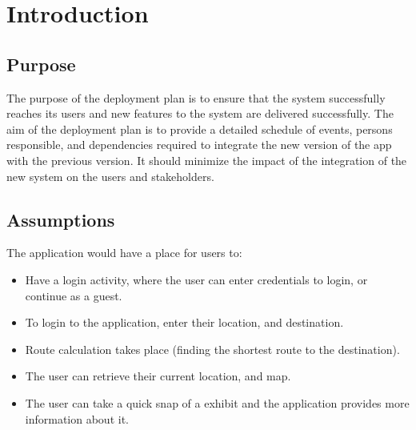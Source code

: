 \section{Introduction}
\subsection{Purpose}
The purpose of the deployment plan is to ensure that the system successfully reaches its users and new features to the system are delivered successfully. The aim of the deployment plan is to provide a detailed schedule of events, persons responsible, and dependencies required to integrate the new version of the app with the previous version. It should minimize the impact of the integration of the new system on the users and stakeholders.

\subsection{Assumptions}
The application would have a place for users to:
\begin{itemize}
    \item Have a login activity, where the user can enter credentials to login, or continue as a guest.
    \item To login to the application, enter their location, and destination.
    \item Route calculation takes place (finding the shortest route to the destination).
    \item The user can retrieve their current location, and map.
    \item The user can take a quick snap of a exhibit and the application provides more information about it.
\end{itemize}

